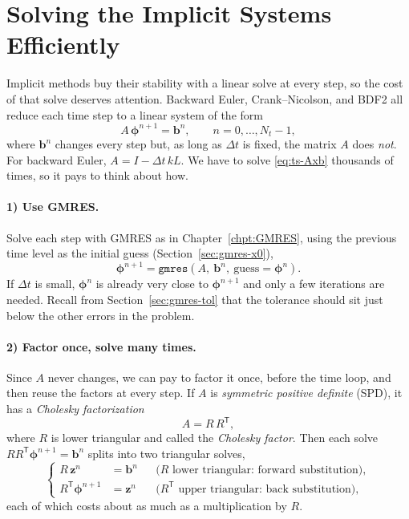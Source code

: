 \section{Solving the Implicit Systems Efficiently}
\label{sec:ts-solve}

Implicit methods buy their stability with a linear solve at every step, so the
cost of that solve deserves attention. Backward Euler, Crank--Nicolson, and BDF2 all reduce each time step to a linear
system of the form
\begin{equation}
  A\,\boldsymbol{\phi}^{n+1} = \mathbf{b}^n, \qquad n = 0,\dots,N_t-1,
  \label{eq:ts-Axb}
\end{equation}
where $\mathbf{b}^n$ changes every step but, as long as $\Delta t$ is fixed, the matrix
$A$ does \emph{not}. For backward Euler, $A = I - \Delta t\,kL$. We have to solve
\eqref{eq:ts-Axb} thousands of times, so it pays to think about how.

\paragraph{1) Use GMRES.} Solve each step with GMRES as in Chapter~\ref{chpt:GMRES},
using the previous time level as the initial guess (Section~\ref{sec:gmres-x0}),
\[
  \boldsymbol{\phi}^{n+1} = \texttt{gmres}(A,\ \mathbf{b}^n,\ \text{guess} = \boldsymbol{\phi}^{n}).
\]
If $\Delta t$ is small, $\boldsymbol{\phi}^n$ is already very close to $\boldsymbol{\phi}^{n+1}$ and only a few
iterations are needed. Recall from Section~\ref{sec:gmres-tol} that the tolerance should
sit just below the other errors in the problem.

\paragraph{2) Factor once, solve many times.} Since $A$ never changes, we can pay to
factor it once, before the time loop, and then reuse the factors at every step. If $A$
is \emph{symmetric positive definite} (SPD), it has a \emph{Cholesky factorization}
\begin{equation}
  A = R\,R^{\mathsf T},
  \label{eq:ts-chol}
\end{equation}
where $R$ is lower triangular and called the \emph{Cholesky factor}. Then each solve
$RR^{\mathsf T}\boldsymbol{\phi}^{n+1} = \mathbf{b}^n$ splits into two triangular solves,
\begin{equation}
  \left\{
  \begin{aligned}
    R\,\mathbf{z}^n &= \mathbf{b}^n && \text{($R$ lower triangular: forward substitution)},\\
    R^{\mathsf T}\boldsymbol{\phi}^{n+1} &= \mathbf{z}^n && \text{($R^{\mathsf T}$ upper triangular: back substitution)},
  \end{aligned}
  \right.
  \label{eq:ts-trisolve}
\end{equation}
each of which costs about as much as a multiplication by $R$.

